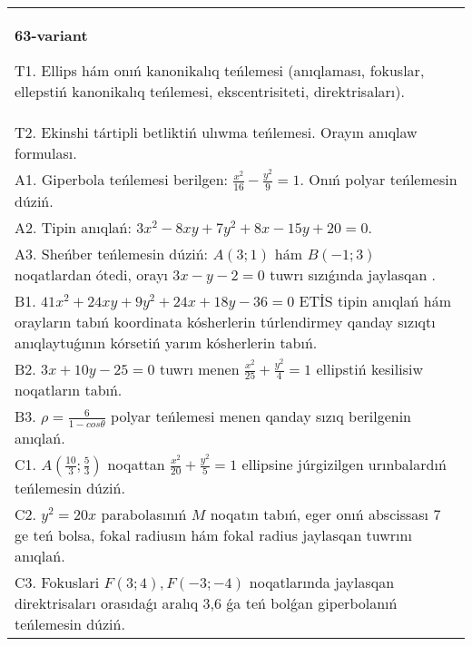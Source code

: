 \documentclass{article}
\begin{document}
\begin{tabular}{m{17cm}}
\textbf{63-variant}
\newline

T1. Ellips hám onıń kanonikalıq teńlemesi (anıqlaması, fokuslar, ellepstiń kanonikalıq teńlemesi, ekscentrisiteti, direktrisaları).\\

T2. Ekinshi tártipli betliktiń ulıwma teńlemesi. Orayın anıqlaw formulası.\\

A1. Giperbola teńlemesi berilgen: $\frac{x^{2}}{16}-\frac{y^{2}}{9}=1$. Onıń polyar teńlemesin dúziń.\\

A2. Tipin anıqlań: $3 x^{2}-8 xy+7 y^{2}+8 x-15 y+20=0$.\\

A3. Sheńber teńlemesin dúziń: $A (3;1) $ hám $B (-1;3) $ noqatlardan ótedi, orayı $3 x-y-2=0$ tuwrı sızıǵında jaylasqan .\\

B1. $41x^{2} + 24xy + 9y^{2} + 24x + 18y - 36 = 0$ ETİS tipin anıqlań hám orayların tabıń koordinata kósherlerin túrlendirmey qanday sızıqtı anıqlaytuǵının kórsetiń yarım kósherlerin tabıń.  \\

B2. $3x + 10y - 25 = 0$ tuwrı menen $\frac{x^{2}}{25} + \frac{y^{2}}{4} = 1$ ellipstiń kesilisiw noqatların tabıń.\\

B3. $\rho = \frac{6}{1 - cos\theta}$ polyar teńlemesi menen qanday sızıq berilgenin anıqlań.  \\

C1. $A(\frac{10}{3};\frac{5}{3})$ noqattan $\frac{x^{2}}{20} + \frac{y^{2}}{5} = 1$ ellipsine júrgizilgen urınbalardıń teńlemesin dúziń.  \\

C2. $y^{2} = 20x$ parabolasınıń $M$ noqatın tabıń, eger onıń abscissası 7 ge teń bolsa, fokal radiusın hám fokal radius jaylasqan tuwrını anıqlań.\\

C3. Fokuslari $F(3;4), F(-3;-4)$ noqatlarında jaylasqan direktrisaları orasıdaǵı aralıq 3,6 ǵa teń bolǵan giperbolanıń teńlemesin dúziń.  \\

\end{tabular}
\vspace{1cm}
\end{document}
